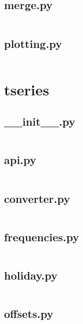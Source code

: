 \documentclass{article}
\begin{document}
\subsection{merge.py}
\inputminted{python}{/home/dufferzafar/dev/@clones/pandas/pandas/tools/merge.py}
\newpage

\subsection{plotting.py}
\inputminted{python}{/home/dufferzafar/dev/@clones/pandas/pandas/tools/plotting.py}
\newpage

\section{tseries}

\subsection{\_\_init\_\_.py}
\inputminted{python}{/home/dufferzafar/dev/@clones/pandas/pandas/tseries/__init__.py}
\newpage

\subsection{api.py}
\inputminted{python}{/home/dufferzafar/dev/@clones/pandas/pandas/tseries/api.py}
\newpage

\subsection{converter.py}
\inputminted{python}{/home/dufferzafar/dev/@clones/pandas/pandas/tseries/converter.py}
\newpage

\subsection{frequencies.py}
\inputminted{python}{/home/dufferzafar/dev/@clones/pandas/pandas/tseries/frequencies.py}
\newpage

\subsection{holiday.py}
\inputminted{python}{/home/dufferzafar/dev/@clones/pandas/pandas/tseries/holiday.py}
\newpage

\subsection{offsets.py}
\inputminted{python}{/home/dufferzafar/dev/@clones/pandas/pandas/tseries/offsets.py}
\newpage
\end{document}
